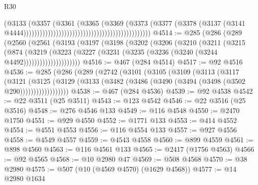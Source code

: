 \begin{lexlean}{R30}
\begin{coremodule}
                                                                              (@3133
                                                                                (@3357
                                                                                  (@3361
                                                                                    (@3365
                                                                                      (@3369
                                                                                        (@3373
                                                                                          (@3377
                                                                                            (@3378
                                                                                              (@3137
                                                                                                (@3141
                                                                                                  @4444)))))))))))))))))))))))))))))))))))))))))))))))
@4514 := @285
    (@286
      (@289
        (@2560
          (@2561
            (@3193
              (@3197
                (@3198
                  (@3202
                    (@3206
                      (@3210
                        (@3211
                          (@3215
                            (@874
                              (@3219
                                (@3223
                                  (@3227
                                    (@3231 (@3235 (@3236 (@3240 (@3244 @4492)))))))))))))))))))))
@4516 := @467 (@284 @4514)
@4517 := @92 @4516
@4536 := @285
    (@286
      (@289
        (@2742
          (@3101
            (@3105
              (@3109
                (@3113
                  (@3117
                    (@3121
                      (@3125
                        (@3129
                          (@3133 (@3482 (@3486 (@3490 (@3494 (@3498 (@3502 @290))))))))))))))))))
@4538 := @467 (@284 @4536)
@4539 := @92 @4538
@4542 := @22 @3511 (@25 @3511)
@4543 := @123 @4542
@4546 := @22 @3516 (@25 @3516)
@4548 := @276 @4546 @133
@4549 := @116 @4548
@4550 := @2470 @1750
@4551 := @929 @4550
@4552 := @1771 @133
@4553 := @414 @4552
@4554 := @4551 @4553
@4556 := @116 @4554 @133
@4557 := @927 @4556
@4558 := @4549 @4557
@4559 := @4543 @4558
@4560 := @899 @4559
@4561 := @898 @4560
@4563 := @116 @4561 @133
@4565 := @2417 (@1756 @4563)
@4566 := @92 @4565
@4568 := @10 @2980 @47
@4569 := @508 @4568
@4570 := @38 @2980
@4575 := @507 (@10 (@4569 @4570) (@1629 @4568))
@4577 := @14 @2980 @1634

\end{coremodule}
\end{lexlean}
